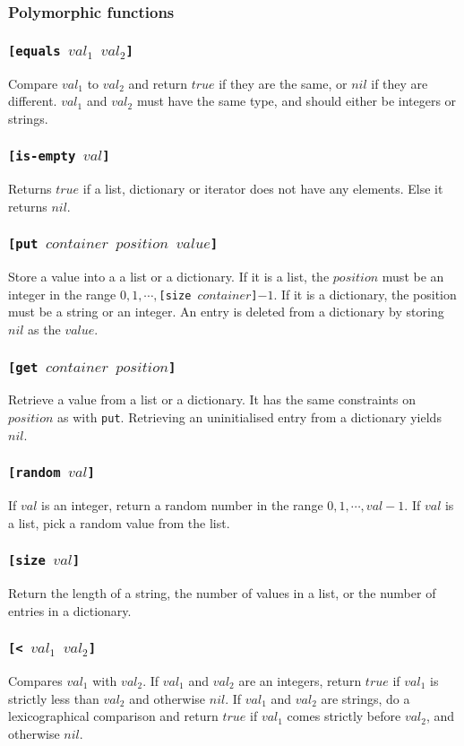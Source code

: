\documentclass[11pt]{report}
\begin{document}
\subsubsection{Polymorphic functions}
\subsubsection*{\tt{[equals }$val_1$ $val_2$\tt{]}}
Compare $val_1$ to $val_2$ and return $true$ if they are the same, or $nil$ if they are different. $val_1$ and $val_2$ must have the same type, and should either be integers or strings.
\subsubsection*{\tt{[is-empty }$val$\tt{]}}
Returns $true$ if a list, dictionary or iterator does not have any elements. Else it returns $nil$.
\subsubsection*{\tt{[put }$container$ $position$ $value$\tt{]}}
Store a value into a a list or a dictionary. If it is a list, the $position$ must be an integer in the range $0,1, \cdots, ${\tt{[size }}$container${\tt{]}}$-1$.
If it is a dictionary, the position must be a string or an integer. An entry is deleted from a dictionary by storing $nil$ as the $value$.
\subsubsection*{\tt{[get }$container$ $position$\tt{]}}
Retrieve a value from a list or a dictionary. It has the same constraints on $position$ as with \verb|put|. Retrieving an uninitialised entry from a dictionary yields $nil$.
\subsubsection*{\tt{[random }$val$\tt{]}}
If $val$ is an integer, return a random number in the range $0,1, \cdots, val -1$. If $val$ is a list, pick a random value from the list.
\subsubsection*{\tt{[size }$val$\tt{]}}
Return the length of a string, the number of values in a list, or the number of entries in a dictionary.
\subsubsection*{\tt{[< }$val_1$ $val_2$\tt{]}}
Compares $val_1$ with $val_2$. If $val_1$ and $val_2$ are an integers, return $true$ if $val_1$ is strictly less than $val_2$ and otherwise $nil$.
If $val_1$ and $val_2$ are strings, do a lexicographical comparison and return $true$ if $val_1$ comes strictly before $val_2$, and otherwise $nil$.
\end{document}
